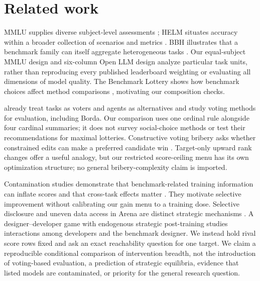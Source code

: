 \section{Related work}
MMLU supplies diverse subject-level assessments \citep{hendrycks2021mmlu}; HELM situates accuracy within a broader collection of scenarios and metrics \citep{liang2023helm}. BBH illustrates that a benchmark family can itself aggregate heterogeneous tasks \citep{suzgun2022bbh}. Our equal-subject MMLU design and six-column Open LLM design analyze particular task units, rather than reproducing every published leaderboard weighting or evaluating all dimensions of model quality. The Benchmark Lottery shows how benchmark choices affect method comparisons \citep{dehghani2021lottery}, motivating our composition checks.

\citet{lanctot2023socialchoice} already treat tasks as voters and agents as alternatives and study voting methods for evaluation, including Borda. Our comparison uses one ordinal rule alongside four cardinal summaries; it does not survey social-choice methods or test their recommendations for maximal lotteries. Constructive voting bribery asks whether constrained edits can make a preferred candidate win \citep{faliszewski2016bribery}. Target-only upward rank changes offer a useful analogy, but our restricted score-ceiling menu has its own optimization structure; no general bribery-complexity claim is imported.

Contamination studies demonstrate that benchmark-related training information can inflate scores and that cross-task effects matter \citep{zhou2023cheater,yang2023rephrased}. They motivate selective improvement without calibrating our gain menu to a training dose. Selective disclosure and uneven data access in Arena are distinct strategic mechanisms \citep{singh2025illusion}. A designer--developer game with endogenous strategic post-training \citep{chen2026incentives} studies interactions among developers and the benchmark designer. We instead hold rival score rows fixed and ask an exact reachability question for one target. We claim a reproducible conditional comparison of intervention breadth, not the introduction of voting-based evaluation, a prediction of strategic equilibria, evidence that listed models are contaminated, or priority for the general research question.
